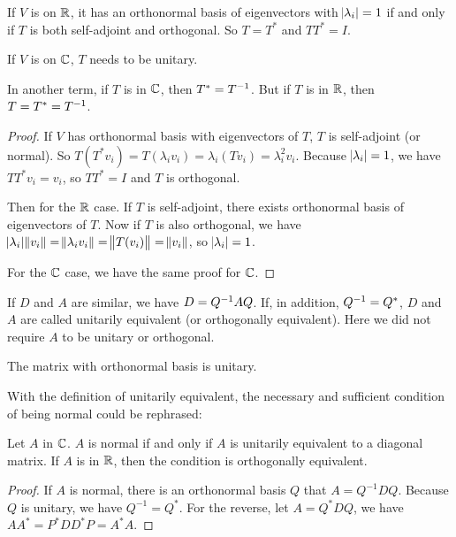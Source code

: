 \begin{theorem}
    If $V$ is on $\mathbb{R}$, it has an orthonormal basis of eigenvectors with $\abs{\lambda_i} = 1$ if and only if $T$ is both self-adjoint and orthogonal. So $T = T^*$ and $TT^* = I$.
    
    If $V$ is on $\mathbb{C}$, $T$ needs to be unitary.
    
    In another term, if $T$ is in $\mathbb{C}$, then $T^* = {T}^{-1}$. But if $T$ is in $\mathbb{R}$, then $T = T^* = {T}^{-1}$.
\end{theorem}
\begin{proof}
    If $V$ has orthonormal basis with eigenvectors of $T$, $T$ is self-adjoint (or normal). So $T(T^* v_i) = T (\lambda_i v_i) = \lambda_i (T v_i) = \lambda_i^2 v_i$. Because $\abs{\lambda_i} = 1$, we have $TT^* v_i = v_i$, so $TT^* = I$ and $T$ is orthogonal.
    
    Then for the $\mathbb{R}$ case. If $T$ is self-adjoint, there exists orthonormal basis of eigenvectors of $T$. Now if $T$ is also orthogonal, we have $\abs{\lambda_i} \norm{v_i} = \norm{\lambda_i v_i} = \norm{T (v_i)} = \norm{v_i}$, so $\abs{\lambda_i} = 1$. 
    
    For the $\mathbb{C}$ case, we have the same proof for $\mathbb{C}$.
\end{proof}


\begin{definition}    
    If $D$ and $A$ are similar, we have $D = {Q}^{-1} A Q$. If, in addition, ${Q}^{-1} = Q^*$, $D$ and $A$ are called unitarily equivalent (or orthogonally equivalent). Here we did not require $A$ to be unitary or orthogonal.
\end{definition}


\begin{theorem}
    The matrix with orthonormal basis is unitary.
\end{theorem}


With the definition of unitarily equivalent, the necessary and sufficient condition of being normal could be rephrased:
\begin{theorem}
    Let $A$ in $\mathbb{C}$. $A$ is normal if and only if $A$ is unitarily equivalent to a diagonal matrix. If $A$ is in $\mathbb{R}$, then the condition is orthogonally equivalent.
\end{theorem}
\begin{proof}
    If $A$ is normal, there is an orthonormal basis $Q$ that $A = Q^{-1} D Q$. Because $Q$ is unitary, we have $Q^{-1} = Q^*$. 
    For the reverse, let $A=Q^* D Q$, we have $AA^* = P^* D D^* P = A^* A$.
\end{proof}

